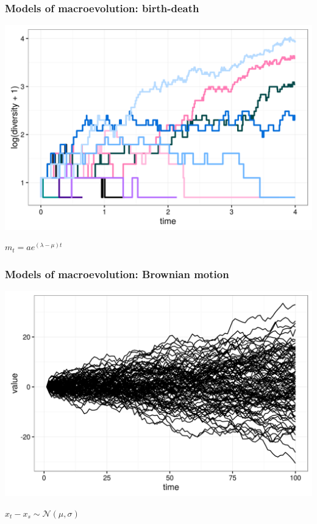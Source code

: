 \documentclass{beamer}
\begin{document}
\begin{frame}
  \frametitle{Models of macroevolution: birth-death}

  \begin{center}
    \includegraphics[width = \textwidth,height = 0.7\textheight,keepaspectratio = true]{figure/bd_sim}

    \(m_{t} = a e^{(\lambda - \mu) t}\)
  \end{center}

\end{frame}

\begin{frame}
  \frametitle{Models of macroevolution: Brownian motion}

  \begin{center}
    \includegraphics[width = \textwidth,height = 0.7\textheight,keepaspectratio = true]{figure/brown_sim}

    \(x_{t} - x_{s} \sim \mathcal{N}(\mu, \sigma)\)
  \end{center}

\end{frame}
\end{document}
